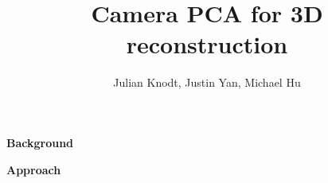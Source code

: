 \documentclass[11pt]{extarticle}
\title{Camera PCA for 3D reconstruction \vspace{-1ex}}
\author{Julian Knodt, Justin Yan, Michael Hu}
\date{}
\begin{document}
\maketitle


{\large \textbf{Background}}




{\large \textbf{Approach}}



% 
% 
\end{document}
